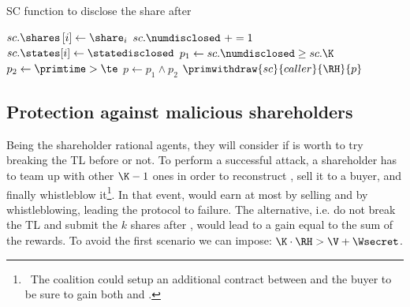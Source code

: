 
\begin{algorithm}[t]
	\caption{SC function to disclose the share after \td}\label{algo:disclose}
	\begin{algorithmic}[1]
		\vspace{0.6em}
		\State $sc.\shares \left[ i \right] \gets \share_{i}$
		\State $sc.\numdisclosed\ += 1$
		\State $sc.\states[i]\gets \statedisclosed$
		\State $p_1 \gets sc.\numdisclosed \ge sc.\K$
		\State $p_2 \gets \primtime > \te$
		\State $p \gets p_1 \wedge p_2$
		\State $\primwithdraw{sc}{caller}{\RH}{p}$
		\EndIf
		\EndIf
		\EndIf
		\EndProcedure
	\end{algorithmic}
\end{algorithm}

\subsection{Protection against malicious shareholders}\label{sect:mal_sha}

Being the shareholder rational agents, they will consider if is worth to try breaking the TL before \td or not.
To perform a successful attack, a shareholder has to team up with other $\K - 1$ ones in order to reconstruct \secret, sell it to a buyer, and finally whistleblow it\footnote{\ The coalition \coalition could setup an additional contract between \coalition and the buyer to be sure to gain both \V and \Wsecret.}.
In that event, \coalition would earn at most by selling and by whistleblowing, leading the protocol to failure. 
The alternative, i.e. do not break the TL and submit the $k$ shares after \td, would lead to a gain equal to the sum of the rewards. 
To avoid the first scenario we can impose:
%
$\K \cdot \RH  > \V + \Wsecret$.

